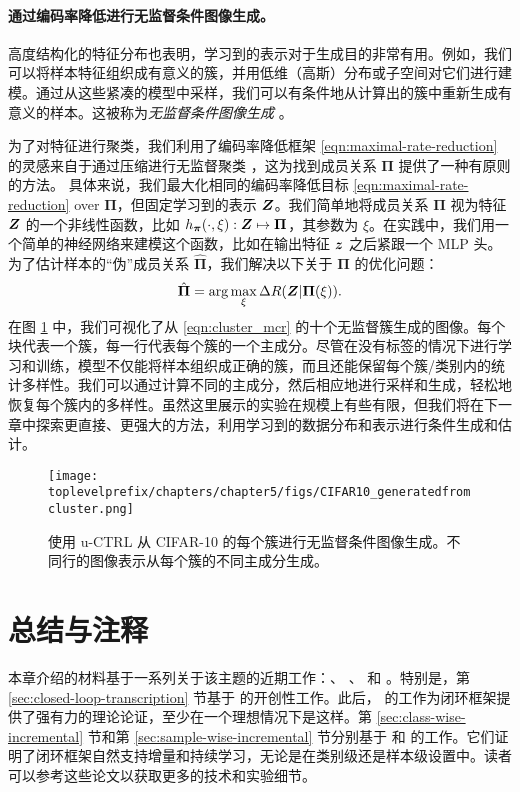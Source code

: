 \documentclass[../../book-main.tex]{subfiles}
\begin{document}
\paragraph{通过编码率降低进行无监督条件图像生成。}
高度结构化的特征分布也表明，学习到的表示对于生成目的非常有用。例如，我们可以将样本特征组织成有意义的簇，并用低维（高斯）分布或子空间对它们进行建模。通过从这些紧凑的模型中采样，我们可以有条件地从计算出的簇中重新生成有意义的样本。这被称为{\em 无监督条件图像生成} \cite{hwang2021stein}。

为了对特征进行聚类，我们利用了编码率降低框架 \eqref{eqn:maximal-rate-reduction} 的灵感来自于通过压缩进行无监督聚类 \cite{ma2007segmentation}，这为找到成员关系 $\bm \Pi$ 提供了一种有原则的方法。
具体来说，我们最大化相同的编码率降低目标 \eqref{eqn:maximal-rate-reduction} over $\bm \Pi$，但固定学习到的表示 $\bm{Z}$。我们简单地将成员关系 $\bm \Pi$ 视为特征 $\bm{Z}$ 的一个非线性函数，比如 $h_{\bm \pi}(\cdot,\xi):\bm{Z} \mapsto \bm \Pi$，其参数为 $\xi$。在实践中，我们用一个简单的神经网络来建模这个函数，比如在输出特征 $\bm{z}$ 之后紧跟一个 MLP 头。
为了估计样本的“伪”成员关系 $\hat{\bm \Pi}$，我们解决以下关于 $\bm \Pi$ 的优化问题：
\begin{align}
    \hat{\bm \Pi} = \arg\max_{\xi} \Delta R(\bm{Z}| \bm \Pi(\xi)).
\label{eqn:cluster_mcr}
\end{align}
在图 \ref{fig:vis_clustering} 中，我们可视化了从 \eqref{eqn:cluster_mcr} 的十个无监督簇生成的图像。每个块代表一个簇，每一行代表每个簇的一个主成分。尽管在没有标签的情况下进行学习和训练，模型不仅能将样本组织成正确的簇，而且还能保留每个簇/类别内的统计多样性。我们可以通过计算不同的主成分，然后相应地进行采样和生成，轻松地恢复每个簇内的多样性。虽然这里展示的实验在规模上有些有限，但我们将在下一章中探索更直接、更强大的方法，利用学习到的数据分布和表示进行条件生成和估计。
\begin{figure}[t]
    \footnotesize
    \centering
    \texttt{[image: \\toplevelprefix/chapters/chapter5/figs/CIFAR10\_generatedfromcluster.png]}
    \caption{\small 使用 u-CTRL 从 CIFAR-10 的每个簇进行无监督条件图像生成。不同行的图像表示从每个簇的不同主成分生成。}
    \label{fig:vis_clustering}
\end{figure}





\section{总结与注释}
本章介绍的材料基于一系列关于该主题的近期工作：\cite{Dai-entropy-2022}、
\cite{pai2022pursuit}、\cite{tong2023incremental} 和 \cite{pmlr-v234-tong24a}。特别是，第 \ref{sec:closed-loop-transcription} 节基于 \cite{Dai-entropy-2022} 的开创性工作。此后，\cite{pai2022pursuit} 的工作为闭环框架提供了强有力的理论论证，至少在一个理想情况下是这样。第 \ref{sec:class-wise-incremental} 节和第 \ref{sec:sample-wise-incremental} 节分别基于 \cite{tong2023incremental} 和 \cite{pmlr-v234-tong24a} 的工作。它们证明了闭环框架自然支持增量和持续学习，无论是在类别级还是样本级设置中。读者可以参考这些论文以获取更多的技术和实验细节。
\end{document}
